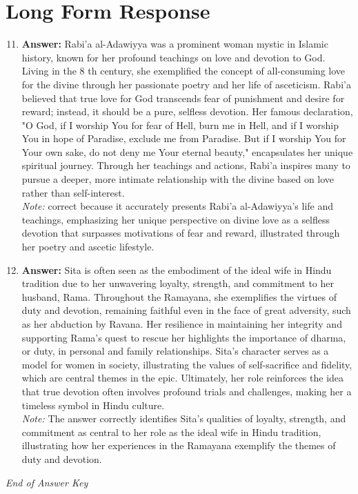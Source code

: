 \documentclass[12pt]{article}
\begin{document}
\section*{Long Form Response}
\begin{enumerate}[label=\arabic*.]
\setcounter{enumi}{10}
\item \textbf{Answer:} Rabi'a al-Adawiyya was a prominent woman mystic in Islamic history, known for her profound teachings on love and devotion to God. Living in the 8 th century, she exemplified the concept of all-consuming love for the divine through her passionate poetry and her life of asceticism. Rabi'a believed that true love for God transcends fear of punishment and desire for reward; instead, it should be a pure, selfless devotion. Her famous declaration, "O God, if I worship You for fear of Hell, burn me in Hell, and if I worship You in hope of Paradise, exclude me from Paradise. But if I worship You for Your own sake, do not deny me Your eternal beauty," encapsulates her unique spiritual journey. Through her teachings and actions, Rabi'a inspires many to pursue a deeper, more intimate relationship with the divine based on love rather than self-interest.
\\ \textit{Note:} correct because it accurately presents Rabi'a al-Adawiyya's life and teachings, emphasizing her unique perspective on divine love as a selfless devotion that surpasses motivations of fear and reward, illustrated through her poetry and ascetic lifestyle.
\item \textbf{Answer:} Sita is often seen as the embodiment of the ideal wife in Hindu tradition due to her unwavering loyalty, strength, and commitment to her husband, Rama. Throughout the Ramayana, she exemplifies the virtues of duty and devotion, remaining faithful even in the face of great adversity, such as her abduction by Ravana. Her resilience in maintaining her integrity and supporting Rama's quest to rescue her highlights the importance of dharma, or duty, in personal and family relationships. Sita's character serves as a model for women in society, illustrating the values of self-sacrifice and fidelity, which are central themes in the epic. Ultimately, her role reinforces the idea that true devotion often involves profound trials and challenges, making her a timeless symbol in Hindu culture.
\\ \textit{Note:} The answer correctly identifies Sita's qualities of loyalty, strength, and commitment as central to her role as the ideal wife in Hindu tradition, illustrating how her experiences in the Ramayana exemplify the themes of duty and devotion.
\end{enumerate}

\vfill
\noindent\textit{End of Answer Key}
\end{document}
